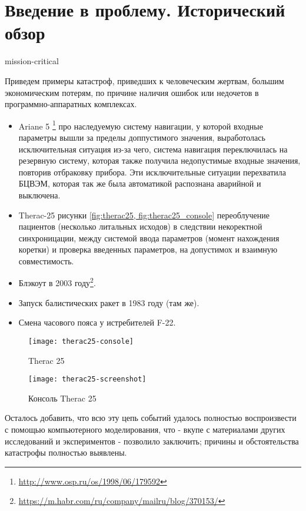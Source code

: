 \chapter{Введение в проблему. Исторический обзор}

mission-critical

Приведем примеры катастроф, приведших к человеческим жертвам, большим экономическим потерям,
по причине наличия ошибок или недочетов в программно-аппаратных комплексах.
\begin{itemize}
    \item Ariane 5 \cite{journal:open_system:1998_adjaev}\footnote{\url{http://www.osp.ru/os/1998/06/179592}}
    про наследуемую систему навигации,
    у которой входные параметры вышли за пределы доппустимого значения,
    выработолась исключительная ситуация из-за чего, система навигация переключилась на резервную систему,
    которая также получила недопустимые входные значения, повторив отбраковку прибора.
    Эти исключительные ситуации перехватила БЦВЭМ, которая так же была автоматикой 
    распознана аварийной и выключена.
    \item Therac-25 \cite{journal:computer:1993:therac25} рисунки \ref{fig:therac25, fig:therac25_console} переоблучение пациентов (несколько литальных исходов) в следствии некоректной синхроницации,
    между системой ввода параметров (момент нахождения коретки) и проверка введенных параметров,
    на допустимох и взаимную совместимость.
    \item Блэкоут в 2003 году\footnote{\url{https://m.habr.com/ru/company/mailru/blog/370153/}}.
    \item Запуск балистических ракет в 1983 году (там же).
    \item Смена часового пояса у истребителей F-22. 
\end{itemize}

\begin{figure}
    \texttt{[image: therac25-console]}
    \caption{Therac 25}\label{fig:therac25}
    \texttt{[image: therac25-screenshot]}
    \caption{Консоль Therac 25}\label{fig:therac25_console}
\end{figure}

Осталось добавить, что всю эту цепь событий удалось полностью воспроизвести с помощью компьютерного моделирования, что - вкупе с материалами других исследований и экспериментов - позволило заключить; причины и обстоятельства катастрофы полностью выявлены.

